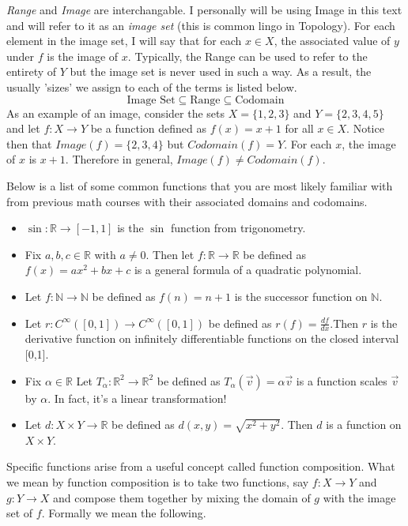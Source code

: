 \documentclass[12pt]{book}
\def\N{{\mathbb{N}}}
\def\R{{\mathbb{R}}}
\begin{document}
\textit{Range} and \textit{Image} are interchangable. I personally will be using Image in this text and will refer to it as an \textit{image set} (this is common lingo in Topology). For each element in the image set, I will say that for each $x\in X$, the associated value of $y$ under $f$ is the image of $x$. Typically, the Range can be used to refer to the entirety of $Y$ but the image set is never used in such a way. As a result, the usually 'sizes' we assign to each of the terms is listed below.
\[\text{Image Set}\subseteq\text{Range}\subseteq\text{Codomain}\]
As an example of an image, consider the sets $X=\{1,2,3\}$ and $Y=\{2,3,4,5\}$ and let $f\colon X\rightarrow Y$ be a function defined as $f(x)=x+1$ for all $x\in X$. Notice then that $Image(f)=\{2,3,4\}$ but $Codomain(f)=Y$. For each $x$, the image of $x$ is $x+1$. Therefore in general, $Image(f)\neq Codomain(f)$.

Below is a list of some common functions that you are most likely familiar with from previous math courses with their associated domains and codomains.
\begin{itemize}[itemsep=0.1mm]
\item $\sin:\R\rightarrow [-1,1]$ is the $\sin$ function from trigonometry.
\item Fix $a,b,c\in\R$ with $a\neq 0$. Then let $f:\R\rightarrow\R$ be defined as $f(x)=ax^2+bx+c$ is a general formula of a quadratic polynomial.
\item Let $f:\N\rightarrow\N$ be defined as $f(n)=n+1$ is the successor function on $\N$. 
\item Let $r:C^\infty([0,1])\rightarrow C^\infty([0,1])$ be defined as $r(f)=\frac{df}{dx}$.Then $r$ is the derivative function on infinitely differentiable functions on the closed interval [0,1].
\item Fix $\alpha\in\R$ Let $T_\alpha:\R^2\rightarrow\R^2$ be defined as $T_\alpha(\vec{v})=\alpha\vec{v}$ is a function scales $\vec{v}$ by $\alpha$. In fact, it's a linear transformation!
\item Let $d:X\times Y\rightarrow\R$ be defined as $d(x,y)=\sqrt{x^2+y^2}$. Then $d$ is a function on $X\times Y$.
\end{itemize}


Specific functions arise from a useful concept called function composition. What we mean by function composition is to take two functions, say $f:X\rightarrow Y$ and $g:Y\rightarrow X$ and compose them together by mixing the domain of $g$ with the image set of $f$. Formally we mean the following.\\
\end{document}
